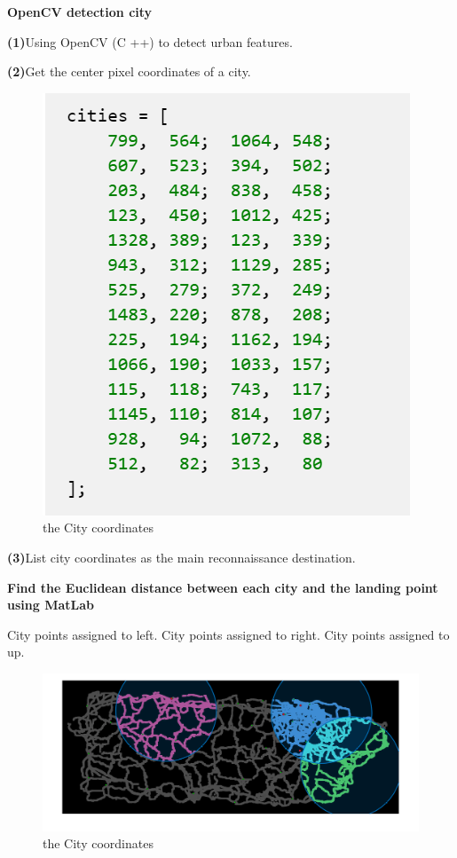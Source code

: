 \documentclass{article} %
\begin{document}
\textbf{OpenCV detection city}


\textbf{(1)}Using OpenCV (C ++) to detect urban features.


\textbf{(2)}Get the center pixel coordinates of a city.


\begin{figure}[h]
    \centering
    \includegraphics[scale=0.7]{65.png}
    \caption{ the City coordinates}
\end{figure}


\textbf{(3)}List city coordinates as the main reconnaissance destination.


\textbf{Find the Euclidean distance between each city and the landing point using MatLab}


City points assigned to left.
City points assigned to right.
City points assigned to up.


\begin{figure}[h]
    \centering
    \includegraphics[scale=0.3]{2.png}
    \caption{ the City coordinates}
\end{figure}
\end{document}
